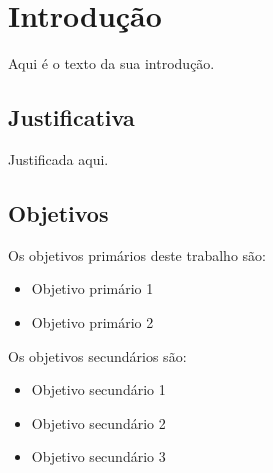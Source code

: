 \chapter[Introdução]{Introdução}
\label{cap:introducao}

Aqui é o texto da sua introdução.

\section{Justificativa}

Justificada aqui.

\section{Objetivos}

Os objetivos primários deste trabalho são:

\begin{itemize}
    \item Objetivo primário 1
    \item Objetivo primário 2
\end{itemize}

Os objetivos secundários são:

\begin{itemize}
    \item Objetivo secundário 1
    \item Objetivo secundário 2
    \item Objetivo secundário 3
\end{itemize}